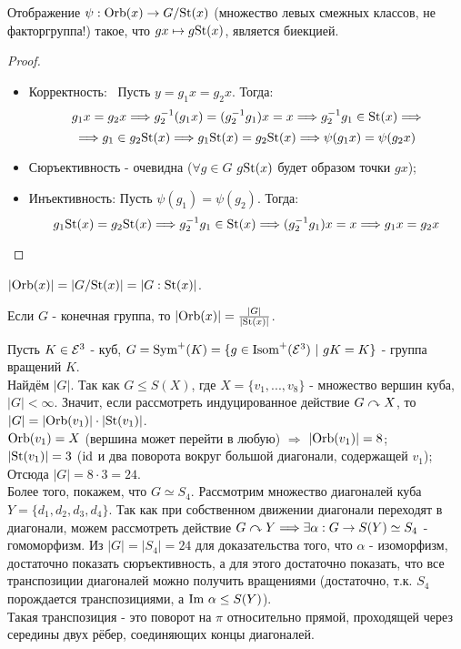 \begin{theorem}
    Отображение $\psi: \textup{Orb}(x) \rightarrow G/\textup{St}(x)$ (множество левых смежных классов, не факторгруппа!) такое, что $gx \mapsto g\textup{St}(x)$, является биекцией.
\end{theorem}
\begin{proof}\tab
    \begin{itemize}
        \item Корректность: \ Пусть $y = g_1x = g_2x$. Тогда:
        \[g_1x = g_2x \Longrightarrow g_2^{-1}(g_1x) = (g_2^{-1}g_1)x = x \Longrightarrow g_2^{-1}g_1 \in \textup{St}(x) \Longrightarrow\]
        \[\Longrightarrow g_1 \in g_2\textup{St}(x)\Longrightarrow g_1\textup{St}(x) = g_2\textup{St}(x) \Longrightarrow \psi(g_1x) = \psi(g_2x)\]
        \item Сюръективность - очевидна ($\forall g \in G$ $g\textup{St}(x)$ будет образом точки $gx$);
        \item Инъективность: Пусть $\psi(g_1) = \psi(g_2) $. Тогда:
        \[g_1\textup{St}(x) = g_2\textup{St}(x) \Longrightarrow g_2^{-1}g_1 \in \textup{St}(x) \Longrightarrow (g_2^{-1}g_1)x = x \Longrightarrow g_1x = g_2x\] 
    \end{itemize}
\end{proof}
\begin{consequensenum}
    $|\textup{Orb}(x)| = |G/\textup{St}(x)| = |G : \textup{St}(x)|$.
\end{consequensenum}
\begin{consequensenum}
    Если $G$ - конечная группа, то $|\textup{Orb}(x)| = \frac{|G|}{|\textup{St}(x)|}$.
\end{consequensenum}
\begin{example} 
    Пусть $K \in \mathcal{E}^3$ - куб, $G = \textup{Sym}^+(K) = \{g \in \textup{Isom}^+(\mathcal{E}^3) \ | \ gK = K\}$ - группа вращений $K$.\\
    Найдём $|G|$. Так как $G \leq S(X)$, где $X = \{v_1,...,v_8\}$ - множество вершин куба, $|G| < \infty$. Значит, если рассмотреть индуцированное действие $G \curvearrowright X$, то $|G| = |\textup{Orb}(v_1)|\cdot |\textup{St}(v_1)|$.\\
    $\textup{Orb}(v_1) = X$ (вершина может перейти в любую) $\Longrightarrow$ $|\textup{Orb}(v_1)| = 8$;\\
    $|\textup{St}(v_1)| = 3$ ($\textup{id}$ и два поворота вокруг большой диагонали, содержащей $v_1$);\\
    Отсюда $|G| = 8 \cdot 3 = 24$.\\
    Более того, покажем, что $G \simeq S_4$. Рассмотрим множество диагоналей куба $Y = \{d_1, d_2, d_3, d_4\}$. Так как при собственном движении диагонали переходят в диагонали, можем рассмотреть действие $G \curvearrowright Y \Longrightarrow \exists \alpha : G \rightarrow S(Y) \simeq S_4$ - гомоморфизм. Из $|G| = |S_4| = 24$ для доказательства того, что $\alpha$ - изоморфизм, достаточно показать сюръективность, а для этого достаточно показать, что все транспозиции диагоналей можно получить вращениями (достаточно, т.к. $S_4$ порождается транспозициями, а $\textup{Im } \alpha \leq S(Y)$).\\
    Такая транспозиция - это поворот на $\pi$ относительно прямой, проходящей через середины двух рёбер, соединяющих концы диагоналей.
\end{example}
